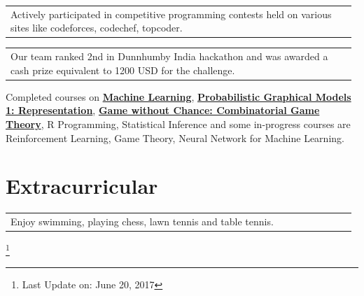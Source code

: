 \documentclass[a4paper]{article} %
\newcommand{\verticalspacing}{-0.25cm}
\newcommand{\bulletspace}{0.7cm}
\newcommand{\projectheadspacing}{6.9cm}
\newcommand{\skill}[2]{%
    \begin{tabular}{p{0.60\linewidth}r}
        \small {#2} & \multicolumn{1}{m{ \projectheadspacing{} }}{\raggedleft \textsc{\small #1}}\\
    \end{tabular}
    \vspace{\verticalspacing{}}
}
\newcommand{\lineskill}[2]{%
    \begin{tabular}{p{0.98\linewidth}r}
        \small {#2} & \multicolumn{1}{m{ \projectheadspacing{} }}{\raggedleft \textsc{\small #1}}\\
    \end{tabular}
    \vspace{\verticalspacing{}}
    \vspace{-0.0cm} %
}
\begin{document}

\lineskill
	{}
    {Actively participated in competitive programming contests held on various sites like codeforces, codechef, topcoder.}

\lineskill
	{}
	{Our team ranked 2nd in Dunnhumby India hackathon and was awarded a cash prize equivalent to 1200 USD for the challenge.}

\lineskill
	{}
	{Completed courses on \href{https://www.coursera.org/account/accomplishments/records/7A66NHG2A623}{\textbf{Machine Learning}}, \href{https://www.coursera.org/account/accomplishments/records/JRHRADFQSTAF}{\textbf{Probabilistic Graphical Models 1: Representation}}, \href{https://www.dropbox.com/s/uda09uulzed6zc7/Game%20without%20chance%20certificate.pdf}{\textbf{Game without Chance: Combinatorial Game Theory}}, R Programming, Statistical Inference and some in-progress courses are Reinforcement Learning, Game Theory, Neural Network for Machine Learning.}
	



\section{Extracurricular}

\lineskill
    {}
    {Enjoy swimming, playing chess, lawn tennis and table tennis.}

\vspace{-0.65cm}
\let\thefootnote\relax\footnote{Last Update on: June 20, 2017}
\end{document}
